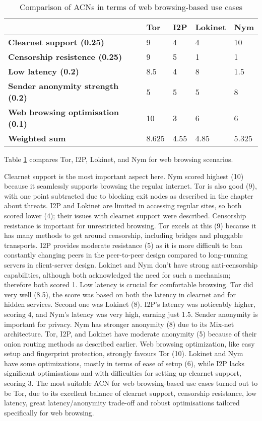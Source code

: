 \begin{table}[!ht]
\caption{Comparison of ACNs in terms of web browsing-based use cases}
\label{tab:web_browsing_uc}
\small
\begin{tabular}{|p{}|p{}|p{}|p{}|p{}|}
\hline
\textbf{} & \textbf{Tor} & \textbf{I2P} & \textbf{Lokinet} & \textbf{Nym} \\
\hline
\textbf{Clearnet support (0.25)} & 9 & 4 & 4 & 10 \\
\hline
\textbf{Censorship resistence (0.25)} & 9 & 5 & 1 & 1 \\
\hline
\textbf{Low latency (0.2)} & 8.5 & 4 & 8 & 1.5 \\
\hline
\textbf{Sender anonymity strength (0.2)} & 5 & 5 & 5 & 8 \\
\hline
\textbf{Web browsing optimisation (0.1)} & 10 & 3 & 6 & 6 \\
\hline
\textbf{Weighted sum} & 8.625 & 4.55 & 4.85 & 5.325 \\
\hline
\end{tabular}
\end{table}

Table \ref{tab:web_browsing_uc} compares Tor, I2P, Lokinet, and Nym for web browsing scenarios.

Clearnet support is the most important aspect here. Nym scored highest (10) because it seamlessly supports browsing the regular internet. Tor is also good (9), with one point subtracted due to blocking  exit nodes as described in the chapter about threats. I2P and Lokinet are limited in accessing regular sites, so both scored lower (4); their issues with clearnet support were described.
Censorship resistance is important for unrestricted browsing. Tor excels at this (9) because it has many methods to get around censorship, including bridges and pluggable transports. I2P provides moderate resistance (5) as it is more difficult to ban constantly changing peers in the peer-to-peer design compared to long-running servers in client-server design. Lokinet and Nym don't have strong anti-censorship capabilities, although both acknowledged the need for such a mechanism; therefore both scored 1.
Low latency is crucial for comfortable browsing. Tor did very well (8.5), the score was based on both the latency in clearnet and for hidden services. Second one was Lokinet (8). I2P's latency was noticeably higher, scoring 4, and Nym’s latency was very high, earning just 1.5.
Sender anonymity is important for privacy. Nym has stronger anonymity (8) due to its Mix-net architecture. Tor, I2P, and Lokinet have moderate anonymity (5) because of their onion routing methods as described earlier.
Web browsing optimization, like easy setup and fingerprint protection, strongly favours Tor (10). Lokinet and Nym have some optimizations, mostly in terms of ease of setup (6), while I2P lacks significant optimisations and with difficulties for setting up clearnet support, scoring 3.
The most suitable ACN for web browsing-based use cases turned out to be Tor, due to its excellent balance of clearnet support, censorship resistance, low latency, great latency/anonymity trade-off and robust optimisations tailored specifically for web browsing. 

